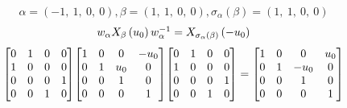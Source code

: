 \documentclass[11pt]{article}
\theoremstyle{definition}
\begin{document}
\[
\alpha = \left( -1, \  1, \  0, \  0\right), \beta = \left( 1, \  1, \  0, \  0\right), \sigma_{\alpha}(\beta) = \left( 1, \  1, \  0, \  0\right)
\]
\[
\scaletoalign{\textwidth}{w_{\alpha} X_{\beta}\left(u_{0}\right) w_{\alpha}^{-1} = X_{\sigma_{\alpha}\left(\beta\right)}\left(- u_{0}\right)}
\]
\[
\scaletoalign{\textwidth}{{\left[\begin{matrix}0 & 1 & 0 & 0\\1 & 0 & 0 & 0\\0 & 0 & 0 & 1\\0 & 0 & 1 & 0\end{matrix}\right]} {\left[\begin{matrix}1 & 0 & 0 & - u_{0}\\0 & 1 & u_{0} & 0\\0 & 0 & 1 & 0\\0 & 0 & 0 & 1\end{matrix}\right]} {\left[\begin{matrix}0 & 1 & 0 & 0\\1 & 0 & 0 & 0\\0 & 0 & 0 & 1\\0 & 0 & 1 & 0\end{matrix}\right]} = {\left[\begin{matrix}1 & 0 & 0 & u_{0}\\0 & 1 & - u_{0} & 0\\0 & 0 & 1 & 0\\0 & 0 & 0 & 1\end{matrix}\right]}}
\]
\end{document}

